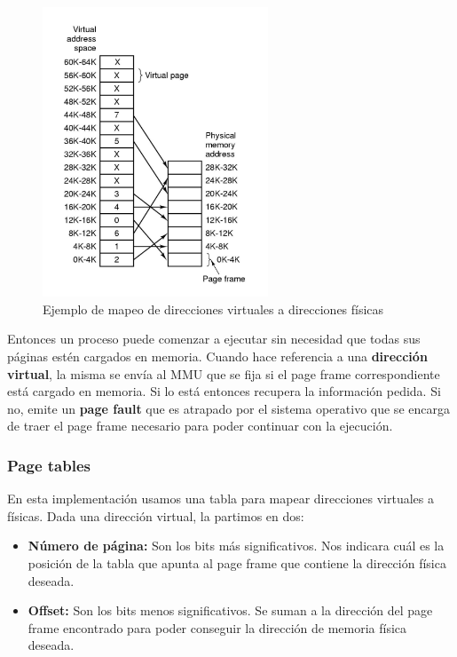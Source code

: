 \begin{figure}[h]
	\centering
	\includegraphics[width=0.6\textwidth]{imagenes/paging-mapping}
	\caption{Ejemplo de mapeo de direcciones virtuales a direcciones físicas}
	\label{fig:paging-mapping}
\end{figure}

Entonces un proceso puede comenzar a ejecutar sin necesidad que todas sus páginas estén cargados en memoria. Cuando hace referencia a una \textbf{dirección virtual}, la misma se envía al MMU que se fija si el page frame correspondiente está cargado en memoria. Si lo está entonces recupera la información pedida. Si no, emite un \textbf{page fault} que es atrapado por el sistema operativo que se encarga de traer el page frame necesario para poder continuar con la ejecución.

\subsubsection{Page tables} 
En esta implementación usamos una tabla para mapear direcciones virtuales a físicas. Dada una dirección virtual, la partimos en dos: 
\begin{itemize}
	\item \textbf{Número de página:} Son los bits más significativos. Nos indicara cuál es la posición de la tabla que apunta al page frame que contiene la dirección física deseada.
	\item \textbf{Offset:} Son los bits menos significativos. Se suman a la dirección del page frame encontrado  para poder conseguir la dirección de memoria física deseada.
\end{itemize}

